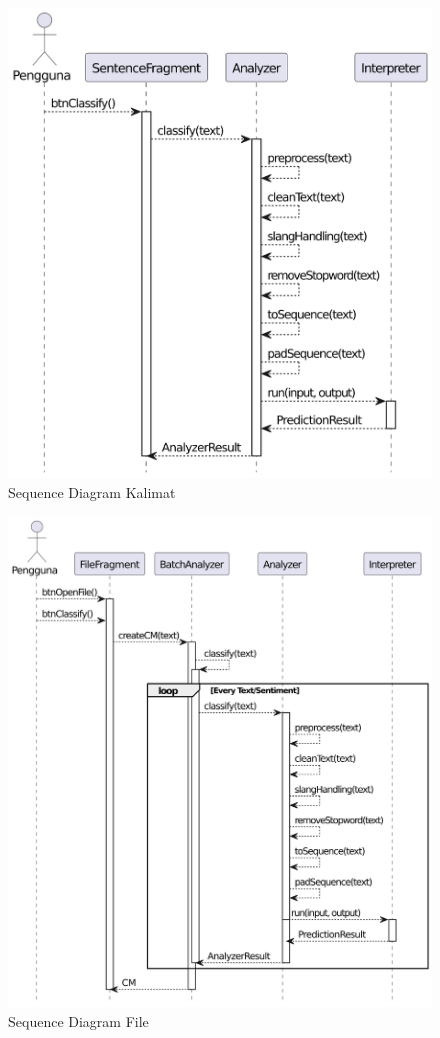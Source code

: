 \begin{figure}[H]
  \centering
  \includegraphics[width=\textwidth]{assets/sequence_diagram_kalimat.png}
  \caption{Sequence Diagram Kalimat}
  \label{fig:sequence_diagram_kalimat}
\end{figure}

\begin{figure}[H]
  \centering
  \includegraphics[width=\textwidth]{assets/sequence_diagram_file.png}
  \caption{Sequence Diagram File}
  \label{fig:sequence_diagram_file}
\end{figure}


